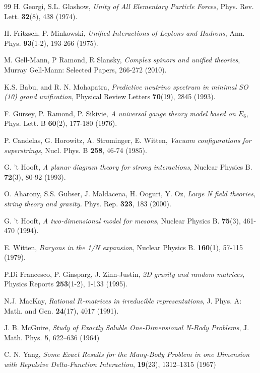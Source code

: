 \documentclass[a4paper]{article}
\renewcommand{\=}{\ =\ }
\numberwithin{equation}{section}
\theoremstyle{remark}
\begin{document}
\begin{thebibliography}{99}
 H. Georgi, S.L. Glashow, \textit{Unity of All Elementary Particle Forces}, Phys. Rev. Lett. \textbf{32}(8), 438 (1974).

 H. Fritzsch, P. Minkowski, \textit{Unified Interactions of Leptons and Hadrons}, Ann. Phys. \textbf{93}(1-2), 193-266 (1975).

 M. Gell-Mann, P Ramond, R Slansky, \textit{Complex spinors and unified theories}, Murray Gell-Mann: Selected Papers, 266-272 (2010).

 K.S. Babu, and R. N. Mohapatra, \textit{Predictive neutrino spectrum in minimal SO (10) grand unification}, Physical Review Letters \textbf{70}(19), 2845 (1993).

 F. Gürsey, P. Ramond, P. Sikivie, \textit{A universal gauge theory model based on $E_6$}, Phys. Lett. B \textbf{60}(2), 177-180 (1976).

 P. Candelas, G. Horowitz, A. Strominger, E. Witten, \textit{Vacuum configurations for superstrings}, Nucl. Phys. B \textbf{258}, 46-74 (1985).

 G. 't Hooft, \textit{A planar diagram theory for strong interactions}, Nuclear Physics B. \textbf{72}(3), 80-92 (1993).

 O. Aharony, S.S. Gubser, J. Maldacena, H. Ooguri,
Y. Oz, \textit{Large N field theories, string theory and gravity.}
Phys. Rep. \textbf{323}, 183 (2000).

 G. 't Hooft, \textit{A two-dimensional model for mesons}, Nuclear Physics B. \textbf{75}(3), 461-470 (1994).

 E. Witten, \textit{Baryons in the 1/N expansion}, Nuclear Physics B. \textbf{160}(1), 57-115 (1979).

 P.Di Francesco, P. Ginsparg, J. Zinn-Justin, \textit{2D gravity and random matrices}, Physics Reports \textbf{253}(1-2), 1-133 (1995).

 N.J. MacKay, \textit{Rational $R$-matrices in irreducible representations}, J. Phys. A: Math. and Gen. \textbf{24}(17), 4017 (1991).

 J. B. McGuire, \textit{Study of Exactly Soluble One‐Dimensional N‐Body Problems}, J. Math. Phys. \textbf{5}, 622–636 (1964)

 C. N. Yang, \textit{Some Exact Results for the Many-Body Problem in one Dimension with Repulsive Delta-Function Interaction}, \textbf{19}(23), 1312--1315 (1967)


\end{thebibliography}
\end{document}
